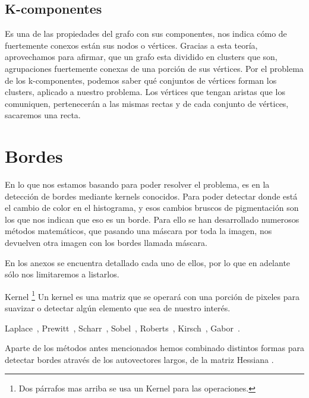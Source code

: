 \subsection{K-componentes}
Es una de las propiedades del grafo con sus componentes, nos indica cómo de fuertemente conexos están sus nodos o vértices.
Gracias a esta teoría, aprovechamos para afirmar, que un grafo esta dividido en clusters que son, agrupaciones fuertemente conexas de una porción de sus vértices.
Por el problema de los k-componentes, podemos saber qué conjuntos de vértices forman los clusters, aplicado a nuestro problema.
Los vértices que tengan aristas que los comuniquen, pertenecerán a las mismas rectas y de cada conjunto de vértices, sacaremos una recta.

\section{Bordes}
En lo que nos estamos basando para poder resolver el problema,
es en la detección de bordes mediante kernels conocidos.
Para poder detectar donde está el cambio de color en el histograma, y esos cambios bruscos de pigmentación son los que nos indican que eso es un borde.
Para ello se han desarrollado numerosos métodos matemáticos, que pasando una máscara por toda la imagen, nos devuelven otra imagen con los bordes llamada máscara.

En los anexos se encuentra detallado cada uno de ellos, por lo que en adelante sólo nos limitaremos a listarlos.

Kernel \cite{wiki:kernels} \footnote{Dos párrafos mas arriba se usa un Kernel para las operaciones.} Un kernel es una matriz que se operará con una porción de pixeles para suavizar o detectar algún elemento que sea de nuestro interés.

Laplace~\cite{wiki:Laplace}, Prewitt~\cite{wiki:Prewitt}, Scharr~\cite{jon:Scharr}, Sobel~\cite{wiki:Sobel}, Roberts~\cite{wiki:Roberts}, Kirsch~\cite{wiki:Kirsch}, Gabor~\cite{wiki:Gabor}.
 
Aparte de los métodos antes mencionados hemos combinado distintos formas para detectar bordes através de los autovectores \cite{wiki:Eigenvector} largos, de la matriz Hessiana \cite{wiki:Hessiana}.